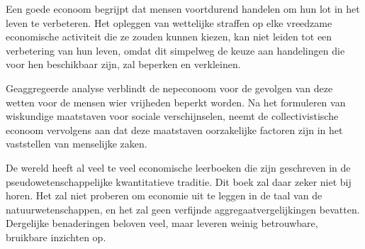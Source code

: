 Een goede econoom begrijpt dat mensen voortdurend handelen om hun lot in het leven te verbeteren. Het opleggen van wettelijke straffen op elke vreedzame economische activiteit die ze zouden kunnen kiezen, kan niet leiden tot een verbetering van hun leven, omdat dit simpelweg de keuze aan handelingen die voor hen beschikbaar zijn, zal beperken en verkleinen.

Geaggregeerde analyse verblindt de nepeconoom voor de gevolgen van deze wetten voor de mensen wier vrijheden beperkt worden. Na het formuleren van wiskundige maatstaven voor sociale verschijnselen, neemt de collectivistische econoom vervolgens aan dat deze maatstaven oorzakelijke factoren zijn in het vaststellen van menselijke zaken.

De wereld heeft al veel te veel economische leerboeken die zijn geschreven in de pseudowetenschappelijke kwantitatieve traditie. Dit boek zal daar zeker niet bij horen. Het zal niet proberen om economie uit te leggen in de taal van de natuurwetenschappen, en het zal geen verfijnde aggregaatvergelijkingen bevatten. Dergelijke benaderingen beloven veel, maar leveren weinig betrouwbare, bruikbare inzichten op.
